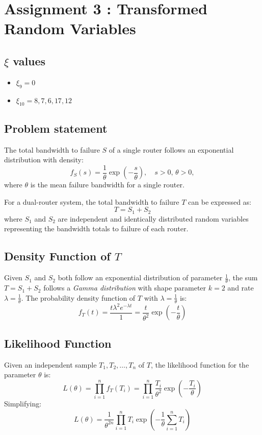 \chapter{Assignment 3 : Transformed Random Variables}

\section*{$\xi$ values}

\begin{itemize}
    \item $\xi_9 = 0$
    \item $\xi_10 = 8,7,6,17,12$
\end{itemize}



\section{Problem statement}
The total bandwidth to failure $ S $ of a single router follows an exponential distribution with density:
\begin{equation}
f_S(s) = \frac{1}{\theta} \exp\left(-\frac{s}{\theta}\right), \quad s > 0, \, \theta > 0,
\end{equation}
where $ \theta $ is the mean failure bandwidth for a single router.

For a dual-router system, the total bandwidth to failure $ T $ can be expressed as:
\begin{equation}
T = S_{1} + S_{2}
\end{equation}
where $ S_{1} $ and $ S_{2} $ are independent and identically distributed random variables representing the bandwidth totals to failure of each router.

\section{Density Function of $ T $}
Given $ S_{1}$ and $ S_{2}$ both follow an exponential distribution of parameter $\frac{1}{\theta}$, the sum $ T = S_{1} + S_{2} $ follows a \emph{Gamma distribution} with shape parameter $ k = 2 $ and rate $ \lambda = \frac{1}{\theta} $. The probability density function of $ T $ with  $ \lambda = \frac{1}{\theta} $ is:
\begin{equation}
f_T(t) = \frac{t \lambda^2 e^{-\lambda t}}{1} = \frac{t}{\theta^2} \exp\left(-\frac{t}{\theta}\right)
\end{equation}

\section{Likelihood Function}
Given an independent sample $ T_1, T_2, \dots, T_n $ of $ T $, the likelihood function for the parameter $ \theta $ is:
\begin{equation}
L(\theta) = \prod_{i=1}^n f_T(T_i) = \prod_{i=1}^n \frac{T_i}{\theta^2} \exp\left(-\frac{T_i}{\theta}\right)
\end{equation}
Simplifying:
\begin{equation}
L(\theta) = \frac{1}{\theta^{2n}} \prod_{i=1}^n T_i \exp\left(-\frac{1}{\theta} \sum_{i=1}^n T_i\right)
\end{equation}

